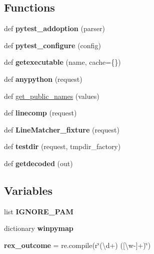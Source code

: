 \subsection*{Functions}
\begin{DoxyCompactItemize}
\item 
\mbox{\label{namespace__pytest_1_1pytester_acdf5568edfdd73f588984ee0060992a3}} 
def {\bfseries pytest\+\_\+addoption} (parser)
\item 
\mbox{\label{namespace__pytest_1_1pytester_a8d8cd593de1d9941768b22bad8ca2534}} 
def {\bfseries pytest\+\_\+configure} (config)
\item 
\mbox{\label{namespace__pytest_1_1pytester_a4b07a5ab2664d710dbcf9eab7bd13556}} 
def {\bfseries getexecutable} (name, cache=\{\})
\item 
\mbox{\label{namespace__pytest_1_1pytester_a4817139ef3593f858636b505df5f6445}} 
def {\bfseries anypython} (request)
\item 
def \hyperlink{namespace__pytest_1_1pytester_a409b7904819230c9816a7d70418a49b1}{get\+\_\+public\+\_\+names} (values)
\item 
\mbox{\label{namespace__pytest_1_1pytester_ac40633319b7e23a066a0eb30327e3e4a}} 
def {\bfseries linecomp} (request)
\item 
\mbox{\label{namespace__pytest_1_1pytester_a9bf7803555cc6bb06c0857899e6431ca}} 
def {\bfseries Line\+Matcher\+\_\+fixture} (request)
\item 
\mbox{\label{namespace__pytest_1_1pytester_a9801a09c32afedd91bb83ae64dc9df51}} 
def {\bfseries testdir} (request, tmpdir\+\_\+factory)
\item 
\mbox{\label{namespace__pytest_1_1pytester_ad3507bc53650a3b3f06acdcfb4d72105}} 
def {\bfseries getdecoded} (out)
\end{DoxyCompactItemize}
\subsection*{Variables}
\begin{DoxyCompactItemize}
\item 
list {\bfseries I\+G\+N\+O\+R\+E\+\_\+\+P\+AM}
\item 
dictionary {\bfseries winpymap}
\item 
\mbox{\label{namespace__pytest_1_1pytester_ad3ffbf083aac60ebd8c3593a0b96895b}} 
{\bfseries rex\+\_\+outcome} = re.\+compile(r\char`\"{}(\textbackslash{}d+) (\mbox{[}\textbackslash{}w-\/\mbox{]}+)\char`\"{})
\end{DoxyCompactItemize}


